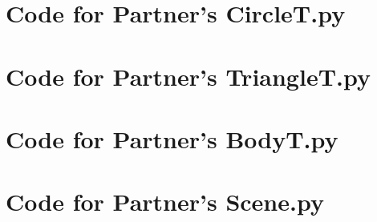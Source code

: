 \documentclass[12pt]{article}
\begin{document}
\section{Code for Partner's CircleT.py}

\noindent 

\newpage

\section{Code for Partner's TriangleT.py}

\noindent 

\newpage

\section{Code for Partner's BodyT.py}

\noindent 

\newpage

\section{Code for Partner's Scene.py}

\noindent 

\newpage
\end{document}
